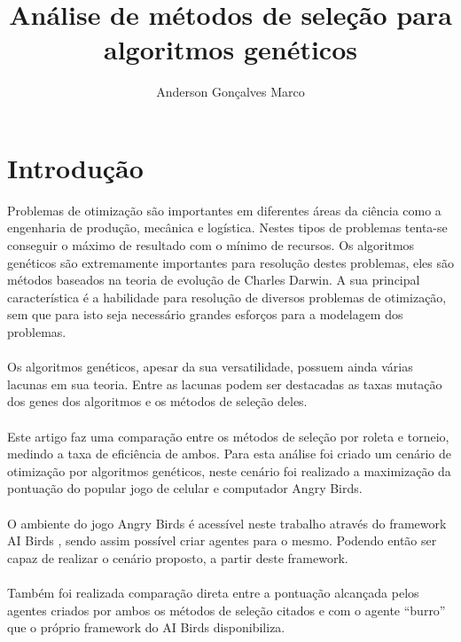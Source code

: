 \documentclass[10pt,a4paper]{article}
\title{Análise de métodos de seleção para algoritmos genéticos}
\author{Anderson Gonçalves Marco}
\begin{document}
\maketitle
\section{Introdução}
Problemas de otimização são importantes em diferentes áreas da ciência como a engenharia de produção, mecânica e logística. Nestes tipos de problemas tenta-se conseguir o máximo de resultado com o mínimo de recursos. Os algoritmos genéticos são extremamente importantes para  resolução destes problemas, eles são métodos baseados na teoria de evolução de Charles Darwin. A sua principal característica é a habilidade para resolução de diversos problemas de otimização, sem que para isto seja necessário grandes esforços para a modelagem dos problemas.\\ \\
Os algoritmos genéticos, apesar da sua versatilidade, possuem ainda várias lacunas em sua teoria. Entre as lacunas podem ser destacadas as taxas mutação dos genes dos algoritmos e os métodos de seleção deles.\\ \\
Este artigo faz uma comparação entre os métodos de seleção por roleta e torneio, medindo a taxa de eficiência de ambos. Para esta análise foi criado um cenário de otimização por algoritmos genéticos, neste cenário foi realizado a maximização da pontuação do popular jogo de celular e computador Angry Birds. \\ \\
O ambiente do jogo Angry Birds é acessível neste trabalho através do framework AI Birds \cite{aiBirds}, sendo assim possível criar agentes para o mesmo. Podendo então ser capaz de realizar o cenário proposto, a partir deste framework. \\ \\ 
Também foi realizada comparação direta entre a pontuação alcançada pelos agentes criados por ambos os métodos de seleção citados e com o agente ``burro'' que o próprio framework do AI Birds disponibiliza.

\end{document}

